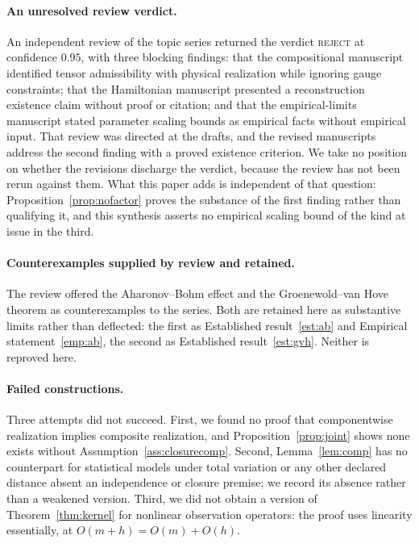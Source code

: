 \documentclass[11pt]{article}
\theoremstyle{definition}
\begin{document}
\paragraph{An unresolved review verdict.}
An independent review of the topic series returned the verdict \textsc{reject}
at confidence $0.95$, with three blocking findings: that the compositional
manuscript identified tensor admissibility with physical realization while
ignoring gauge constraints; that the Hamiltonian manuscript presented a
reconstruction existence claim without proof or citation; and that the
empirical-limits manuscript stated parameter scaling bounds as empirical facts
without empirical input. That review was directed at the drafts, and the revised
manuscripts address the second finding with a proved existence criterion. We
take no position on whether the revisions discharge the verdict, because the
review has not been rerun against them. What this paper adds is independent of
that question: Proposition~\ref{prop:nofactor} proves the substance of the first
finding rather than qualifying it, and this synthesis asserts no empirical
scaling bound of the kind at issue in the third.

\paragraph{Counterexamples supplied by review and retained.}
The review offered the Aharonov--Bohm effect and the Groenewold--van Hove
theorem as counterexamples to the series. Both are retained here as substantive
limits rather than deflected: the first as Established result~\ref{est:ab} and
Empirical statement~\ref{emp:ab}, the second as Established
result~\ref{est:gvh}. Neither is reproved here.

\paragraph{Failed constructions.}
Three attempts did not succeed. First, we found no proof that componentwise
realization implies composite realization, and Proposition~\ref{prop:joint}
shows none exists without Assumption~\ref{ass:closurecomp}. Second,
Lemma~\ref{lem:comp} has no counterpart for statistical models under total
variation or any other declared distance absent an independence or closure
premise; we record its absence rather than a weakened version. Third, we did not
obtain a version of Theorem~\ref{thm:kernel} for nonlinear observation
operators: the proof uses linearity essentially, at $O(m+h)=O(m)+O(h)$.
\end{document}
